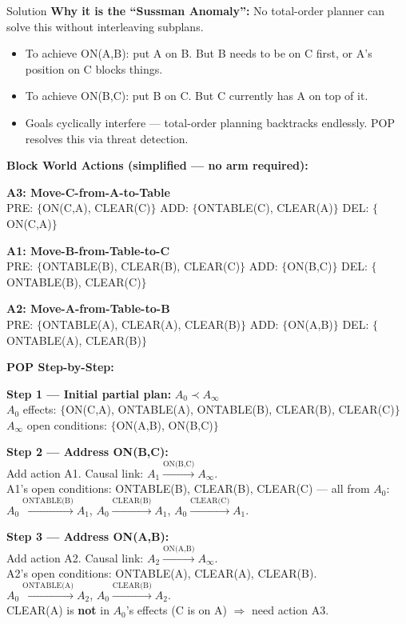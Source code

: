 \documentclass[12pt,a4paper]{article}
\begin{document}
\begin{solbox}{Solution}
\textbf{Why it is the ``Sussman Anomaly'':}
No total-order planner can solve this without interleaving subplans.
\begin{itemize}[noitemsep]
  \item To achieve ON(A,B): put A on B. But B needs to be on C first, or A's position
    on C blocks things.
  \item To achieve ON(B,C): put B on C. But C currently has A on top of it.
  \item Goals cyclically interfere --- total-order planning backtracks endlessly.
    POP resolves this via threat detection.
\end{itemize}

\bigskip
\textbf{Block World Actions (simplified --- no arm required):}

\medskip
\textbf{A3: Move-C-from-A-to-Table}\\
\phantom{xxx}PRE: $\{$ON(C,A), CLEAR(C)$\}$ \quad ADD: $\{$ONTABLE(C), CLEAR(A)$\}$ \quad DEL: $\{$ON(C,A)$\}$

\medskip
\textbf{A1: Move-B-from-Table-to-C}\\
\phantom{xxx}PRE: $\{$ONTABLE(B), CLEAR(B), CLEAR(C)$\}$ \quad ADD: $\{$ON(B,C)$\}$ \quad DEL: $\{$ONTABLE(B), CLEAR(C)$\}$

\medskip
\textbf{A2: Move-A-from-Table-to-B}\\
\phantom{xxx}PRE: $\{$ONTABLE(A), CLEAR(A), CLEAR(B)$\}$ \quad ADD: $\{$ON(A,B)$\}$ \quad DEL: $\{$ONTABLE(A), CLEAR(B)$\}$

\bigskip
\textbf{POP Step-by-Step:}

\textbf{Step 1 --- Initial partial plan:} $A_0 \prec A_\infty$\\
$A_0$ effects: $\{$ON(C,A), ONTABLE(A), ONTABLE(B), CLEAR(B), CLEAR(C)$\}$\\
$A_\infty$ open conditions: $\{$ON(A,B), ON(B,C)$\}$

\medskip
\textbf{Step 2 --- Address ON(B,C):}\\
Add action A1. Causal link: $A_1 \xrightarrow{\text{ON(B,C)}} A_\infty$.\\
A1's open conditions: ONTABLE(B), CLEAR(B), CLEAR(C) --- all from $A_0$:\\
$A_0 \xrightarrow{\text{ONTABLE(B)}} A_1$,\quad
$A_0 \xrightarrow{\text{CLEAR(B)}} A_1$,\quad
$A_0 \xrightarrow{\text{CLEAR(C)}} A_1$.

\medskip
\textbf{Step 3 --- Address ON(A,B):}\\
Add action A2. Causal link: $A_2 \xrightarrow{\text{ON(A,B)}} A_\infty$.\\
A2's open conditions: ONTABLE(A), CLEAR(A), CLEAR(B).\\
$A_0 \xrightarrow{\text{ONTABLE(A)}} A_2$, \quad $A_0 \xrightarrow{\text{CLEAR(B)}} A_2$.\\
CLEAR(A) is \textbf{not} in $A_0$'s effects (C is on A) $\Rightarrow$ need action A3.


\end{solbox}
\end{document}
